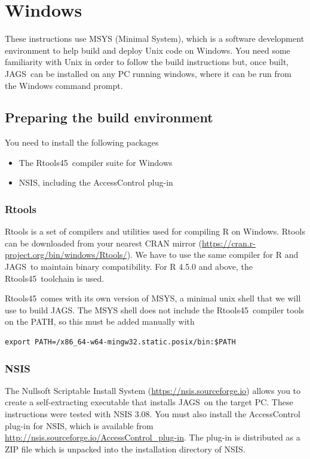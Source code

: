 \documentclass[11pt, a4paper, titlepage]{article}
\newcommand{\JAGS}{\textsf{JAGS}}
\newcommand{\Rtools}{\textsf{Rtools45}}
\begin{document}
\clearpage
\section{Windows}
\label{section:windows}

These instructions use MSYS (Minimal System), which is a software
development environment to help build and deploy Unix code on Windows.
You need some familiarity with Unix in order to follow the build
instructions but, once built, \JAGS\ can be installed on any PC
running windows, where it can be run from the Windows command prompt.

\subsection{Preparing the build environment}

You need to install the following packages
\begin{itemize}
\item The \Rtools\ compiler suite for Windows
\item NSIS, including the AccessControl plug-in  
\end{itemize}

\subsubsection{Rtools}

Rtools is a set of compilers and utilities used for compiling R on
Windows. Rtools can be downloaded from your nearest CRAN mirror
(\url{https://cran.r-project.org/bin/windows/Rtools/}). We have to use
the same compiler for R and \JAGS\ to maintain binary compatibility.
For R 4.5.0 and above, the \Rtools\ toolchain is used.

\Rtools\ comes with its own version of MSYS, a minimal unix shell that
we will use to build \JAGS. The MSYS shell does not include the
\Rtools\ compiler tools on the PATH, so this must be added manually
with
\begin{verbatim}
export PATH=/x86_64-w64-mingw32.static.posix/bin:$PATH
\end{verbatim}

\subsubsection{NSIS}

The Nullsoft Scriptable Install System
(\url{https://nsis.sourceforge.io}) allows you to create a
self-extracting executable that installs \JAGS\ on the target PC.
These instructions were tested with NSIS 3.08.  You must also install
the AccessControl plug-in for NSIS, which is available from
\url{http://nsis.sourceforge.io/AccessControl_plug-in}. The plug-in
is distributed as a ZIP file which is unpacked into the installation
directory of NSIS.
\end{document}
